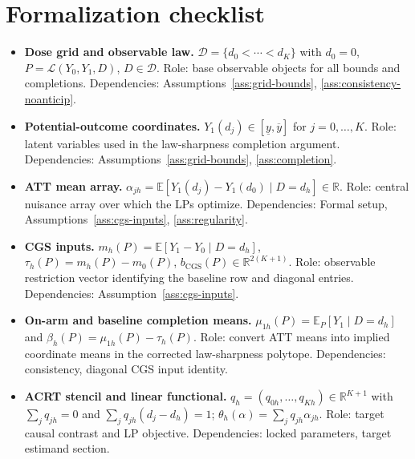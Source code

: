 \documentclass[11pt]{article}
\newcommand{\E}{\mathbb{E}}
\newcommand{\R}{\mathbb{R}}
\theoremstyle{definition}
\theoremstyle{plain}
\theoremstyle{remark}
\begin{document}
\section{Formalization checklist}
\begin{itemize}[leftmargin=*]
  \item \textbf{Dose grid and observable law.} \(\mathcal D=\{d_0<\cdots<d_K\}\) with \(d_0=0\), \(P=\mathcal L(Y_0,Y_1,D)\), \(D\in\mathcal D\).  Role: base observable objects for all bounds and completions.  Dependencies: Assumptions~\ref{ass:grid-bounds}, \ref{ass:consistency-noanticip}.
  \item \textbf{Potential-outcome coordinates.} \(Y_1(d_j)\in[\underline y,\overline y]\) for \(j=0,\ldots,K\).  Role: latent variables used in the law-sharpness completion argument.  Dependencies: Assumptions~\ref{ass:grid-bounds}, \ref{ass:completion}.
  \item \textbf{ATT mean array.} \(\alpha_{jh}=\E[Y_1(d_j)-Y_1(d_0)\mid D=d_h]\in\R\).  Role: central nuisance array over which the LPs optimize.  Dependencies: Formal setup, Assumptions~\ref{ass:cgs-inputs}, \ref{ass:regularity}.
  \item \textbf{CGS inputs.} \(m_h(P)=\E[Y_1-Y_0\mid D=d_h]\), \(\tau_h(P)=m_h(P)-m_0(P)\), \(b_{\mathrm{CGS}}(P)\in\R^{2(K+1)}\).  Role: observable restriction vector identifying the baseline row and diagonal entries.  Dependencies: Assumption~\ref{ass:cgs-inputs}.
  \item \textbf{On-arm and baseline completion means.} \(\mu_{1h}(P)=\E_P[Y_1\mid D=d_h]\) and \(\beta_h(P)=\mu_{1h}(P)-\tau_h(P)\).  Role: convert ATT means into implied coordinate means in the corrected law-sharpness polytope.  Dependencies: consistency, diagonal CGS input identity.
  \item \textbf{ACRT stencil and linear functional.} \(q_h=(q_{0h},\ldots,q_{Kh})\in\R^{K+1}\) with \(\sum_j q_{jh}=0\) and \(\sum_j q_{jh}(d_j-d_h)=1\); \(\theta_h(\alpha)=\sum_j q_{jh}\alpha_{jh}\).  Role: target causal contrast and LP objective.  Dependencies: locked parameters, target estimand section.

\end{itemize}
\end{document}
